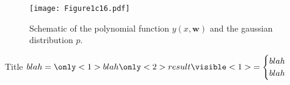 \begin{frame}{\insertsubsection}
	\begin{figure}
		\label{schematic-gaussian-distribution}
		\texttt{[image: Figure1c16.pdf]}
		\caption{Schematic of the polynomial function $y(x,\mathbf{w})$ and the gaussian distribution $p$.}

	\end{figure}
\end{frame}


\begin{frame}{Title}
  $
    blah =
    \only<1>{blah}
    \only<2>{result}
    \visible<1>{%
      =
      \begin{cases}
          blah \\ 
          blah
        \end{cases}
      }
    $
\end{frame}